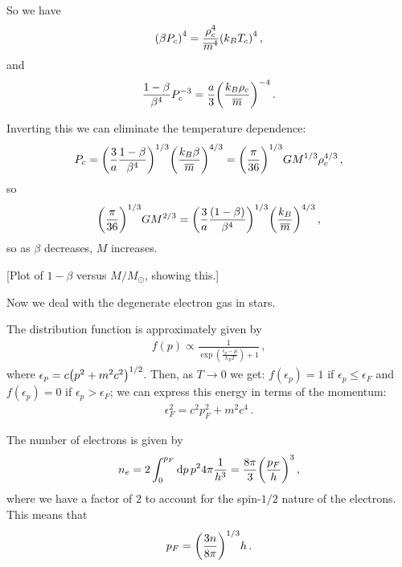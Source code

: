 \documentclass[main.tex]{subfiles}
\begin{document}
So we have 
%
\begin{align}
  \qty(\beta P_c )^{4} = \frac{\rho _c^{4}}{\overline{m}^{4}} \qty(k_B T_c)^{4}
\,,
\end{align}
%
and 
%
\begin{align}
  \frac{1 - \beta }{\beta^{4}} P_c^{-3} = \frac{a}{3}
  \qty(\frac{k_B \rho _c }{\overline{m}})^{-4}
\,.
\end{align}

Inverting this we can eliminate the temperature dependence: 
%
\begin{align}
  P_c = \qty(\frac{3}{a} \frac{1 - \beta  }{\beta^{4}})^{1/3} \qty(\frac{k_B \beta }{\overline{m}})^{4/3}
  = \qty(\frac{\pi }{36})^{1/3} G M^{1/3} \rho _c^{4/3}
\,,
\end{align}
%
so 
%
\begin{align}
  \qty(\frac{\pi }{36})^{1/3} G M^{2/3} 
  = \qty(\frac{3}{a} \frac{(1-\beta )}{\beta^{4}})^{1/3}
  \qty(\frac{k_B}{\overline{m}})^{4/3}
\,,
\end{align}
%
so as \(\beta \) decreases, \(M\) increases. 

[Plot of \(1 - \beta \) versus \(M / M_{\odot} \), showing this.]

Now we deal with the degenerate electron gas in stars. 

The distribution function is approximately given by 
%
\begin{align}
  f(p) \propto \frac{1}{\exp(\frac{\epsilon _p - \mu }{k_B T})+1}
\,,
\end{align}
%
where \(\epsilon _p = c\qty(p^2+m^2c^2)^{1/2}\). 
Then, as \(T \rightarrow 0\) we get: \(f(\epsilon _p) = 1\) if \(\epsilon _p \leq \epsilon _F\) and \(f(\epsilon _p) = 0 \) if \(\epsilon _p > \epsilon _F\); we can express this energy in terms of the momentum: 
%
\begin{align}
  \epsilon_F^2 = c^2p_F^2 + m^2 c^{4}
\,.
\end{align}

The number of electrons is given by 
%
\begin{align}
  n_e = 2 \int_{0}^{p_F} \dd{p} p^2 4 \pi \frac{1}{h^3}
  = \frac{8 \pi }{3} \qty(\frac{p_F}{h})^{3}
\,,
\end{align}
%
where we have a factor of \(2\) to account for the spin-\(1/2\) nature of the electrons. 
This means that 
%
\begin{align}
  p_F = \qty(\frac{3n}{8 \pi })^{1/3} h
\,.
\end{align}
\end{document}

